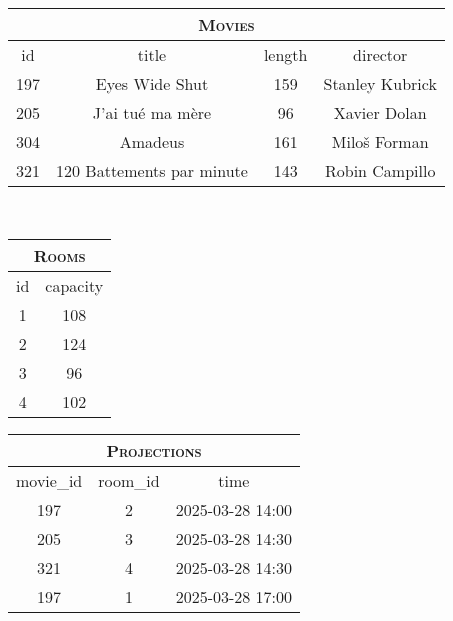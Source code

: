{%
	\footnotesize%
	\begin{tabular}{cccc}
		\multicolumn{4}{c}{\textsc{Movies}} \\ \toprule
		id & title & length & director \\ \midrule
		197 & Eyes Wide Shut & 159 & Stanley Kubrick \\ 
		205 & J'ai tué ma mère & 96 & Xavier Dolan \\
		304 & Amadeus & 161 & Miloš Forman \\
		321 & 120 Battements par minute & 143 & Robin Campillo \\ \bottomrule
	\end{tabular}
	\\\bigskip%
	\begin{tabular}{cc}
		\multicolumn{2}{c}{\textsc{Rooms}} \\ \toprule
		id & capacity  \\ \midrule
		1 & 108 \\
		2 & 124 \\
		3 & 96 \\
		4 & 102 \\ \bottomrule
	\end{tabular}%
	\hspace{1cm}%
	\begin{tabular}{ccc}
		\multicolumn{3}{c}{\textsc{Projections}} \\ \toprule
		movie\_id & room\_id & time \\ \midrule
		197 & 2 & 2025-03-28 14:00 \\
		205 & 3 & 2025-03-28 14:30 \\
		321 & 4 & 2025-03-28 14:30 \\
		197 & 1 & 2025-03-28 17:00 \\ \bottomrule
	\end{tabular}
}